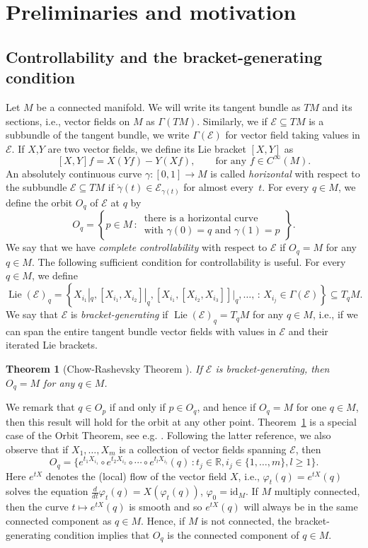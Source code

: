 \documentclass[10pt]{amsart}
\newcounter{dummy} \numberwithin{dummy}{section}
\newtheorem{theorem}[dummy]{Theorem}
\theoremstyle{remark}
\DeclareMathOperator{\Lie}{Lie}
\newcommand{\E}{\mathcal{E}}
\numberwithin{equation}{section}
\begin{document}
\section{Preliminaries and motivation}
\subsection{Controllability and the bracket-generating condition} \label{sec:Prelim}
Let $M$ be a connected manifold. We will write its tangent bundle as $TM$ and its sections, i.e., vector fields on $M$ as $\Gamma(TM)$. Similarly, we if $\E \subseteq TM$ is a subbundle of the tangent bundle, we write $\Gamma(\E)$ for vector field taking values in $\E$. If $X$,$Y$ are two vector fields, we define its Lie bracket $[X,Y]$ as
$$[X,Y]f = X(Yf) - Y(Xf), \qquad \text{for any $f \in C^\infty(M)$}.$$
An absolutely continuous curve $\gamma:[0,1] \to M$ is called \emph{horizontal} with respect to the subbundle $\E\subseteq TM$ if $\dot \gamma(t) \in \E_{\gamma(t)}$ for almost every~$t$. For every $q \in M$, we define the orbit $O_q$ of $\E$ at $q$ by
$$O_q = \left\{ p \in M \, : \, \begin{array}{c} \text{there is a horizontal curve} \\ \text{with $\gamma(0) = q$ and $\gamma(1) = p$}\end{array} \right\}.$$
We say that we have \emph{complete controllability} with respect to $\E$ if $O_q =M$ for any $q \in M$. The following sufficient condition for controllability is useful. For every $q \in M$, we define
$$\Lie(\E)_q = \left\{ X_{i_1}|_q, [X_{i_1},X_{i_2}]|_q, [X_{i_1}, [X_{i_2}, X_{i_3}]]|_q , \dots, \, : \, X_{i_j} \in \Gamma(\E) \right\} \subseteq T_qM.$$
We say that $\E$ is \emph{bracket-generating} if $\Lie(\E)_q = T_q M$ for any $q \in M$, i.e., if we can span the entire tangent bundle vector fields with values in $\E$ and their iterated Lie brackets.
\begin{theorem}[Chow-Rashevsky Theorem \cite{rashevsky1938connecting,Chow39}] \label{th:CR}
If $\E$ is bracket-generating, then $O_q = M$ for any $q \in M$.
\end{theorem}
We remark that $q \in O_p$ if and only if $p \in O_q$, and hence if $O_q = M$ for one $q \in M$, then this result will hold for the orbit at any other point. Theorem~\ref{th:CR} is a special case of the Orbit Theorem, see e.g. \cite[Chapter~5]{AS04}. Following the latter reference, we also observe that if $X_1, \dots, X_m$ is a collection of vector fields spanning $\E$, then
$$O_q = \{ e^{t_1X_{i_1}} \circ e^{t_2 X_{i_2}} \circ \cdots \circ e^{t_l X_{i_l}}(q) \,: t_j \in \mathbb{R},  i_j  \in \{1,\dots, m\}, l \geq 1 \}.$$
Here $e^{tX}$ denotes the (local) flow of the vector field $X$, i.e., $\varphi_t(q) =e^{tX}(q)$ solves the equation $\frac{d}{dt} \varphi_t(q) = X(\varphi_t(q))$, $\varphi_0 = \mathrm{id}_M$. If $M$ multiply connected, then the curve $t \mapsto e^{tX}(q)$ is smooth and so $e^{tX}(q)$ will always be in the same connected component as $q\in M$. Hence, if $M$ is not connected, the bracket-generating condition implies that $O_q$ is the connected component of $q \in M$.
\end{document}
